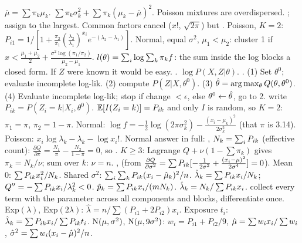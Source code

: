 \sk{} $\bar\mu=\sum\pi_k\mu_k$.  $\sum\pi_k\sigma_k^2+\sum\pi_k(\mu_k-\bar\mu)^2$. Poisson mixtures are overdispersed.
\sk{} ; assign to the largest. Common factors cancel ($x!$, $\sqrt{2\pi}$) but . Poisson, $K=2$: $P_{i1}=1/[1+\frac{\pi_2}{\pi_1}(\frac{\lambda_2}{\lambda_1})^{x_i}e^{-(\lambda_2-\lambda_1)}]$. Normal, equal $\sigma^2$, $\mu_1<\mu_2$: cluster 1 if $x<\frac{\mu_1+\mu_2}2+\frac{\sigma^2\log(\pi_1/\pi_2)}{\mu_2-\mu_1}$.
\bx
{} $l(\theta)=\sum_{i}\log\sum_k\pi_kf$: the sum inside the log blocks a closed form. If $Z$ were known it would be easy.
\sk{} .  $\log P(X,Z|\theta)$.  .
\sk{} (1) Set $\theta^0$; evaluate incomplete log-lik. (2)  compute $P(Z|X,\theta^0)$. (3)  $\hat{\theta}=\arg\max_\theta Q(\theta,\theta^0)$. (4) Evaluate incomplete log-lik; stop if change $<\epsilon$, else $\theta^0\leftarrow\hat{\theta}$, go to 2.
\sk{} write $P_{ik}=P(Z_i=k|X_i,\theta^0)$.
$\mathbb{E}[I(Z_i=k)]=P_{ik}$ and only $I$ is random, so
$K=2$: $\pi_1=\pi$, $\pi_2=1-\pi$. Normal: $\log f=-\frac12\log(2\pi\sigma_k^2)-\frac{(x_i-\mu_k)^2}{2\sigma_k^2}$ (that $\pi$ is 3.14). Poisson: $x_i\log\lambda_k-\lambda_k-\log x_i!$. Normal answer in full:
\sk{}, $N_k=\sum_{i}P_{ik}$ (effective count):
\li\bh{$\pi$:} $\frac{\partial Q}{\partial\pi}=\frac{N_1}\pi-\frac{N_2}{1-\pi}=0$, so . $K\ge3$: Lagrange $Q+\nu(1-\sum\pi_k)$ gives $\pi_k=N_k/\nu$; sum over $k$: $\nu=n$.
\li{} ,  (from $\frac{\partial Q}{\partial\sigma^2}=\sum P_{ik}[-\frac1{2\sigma^2}+\frac{(x_i-\mu)^2}{2\sigma^4}]=0$). Mean 0: $\sum P_{ik} x_i^2/N_k$. Shared $\sigma^2$: $\sum_{i}\sum_{k}P_{ik}(x_i-\hat{\mu}_k)^2/n$.
\li{} $\hat\lambda_k=\sum P_{ik} x_i/N_k$; $Q''=-\sum P_{ik} x_i/\lambda_k^2<0$.  $\hat p_k=\sum P_{ik} x_i/(mN_k)$.  $\hat\lambda_k=N_k/\sum P_{ik} x_i$.
\sk{} collect every term with the parameter across all components and blocks, differentiate once. Exp$(\lambda)$, Exp$(2\lambda)$: $\hat\lambda=n/\sum(P_{i1}+2P_{i2})x_i$. Exposure $t_i$: $\hat\lambda_k=\sum P_{ik} x_i/\sum P_{ik} t_i$. $\mathrm{N}(\mu,\sigma^2)$, $\mathrm{N}(\mu,9\sigma^2)$: $w_i=P_{i1}+P_{i2}/9$, $\hat{\mu}=\sum w_ix_i/\sum w_i$, $\hat\sigma^2=\sum w_i(x_i-\hat{\mu})^2/n$.
